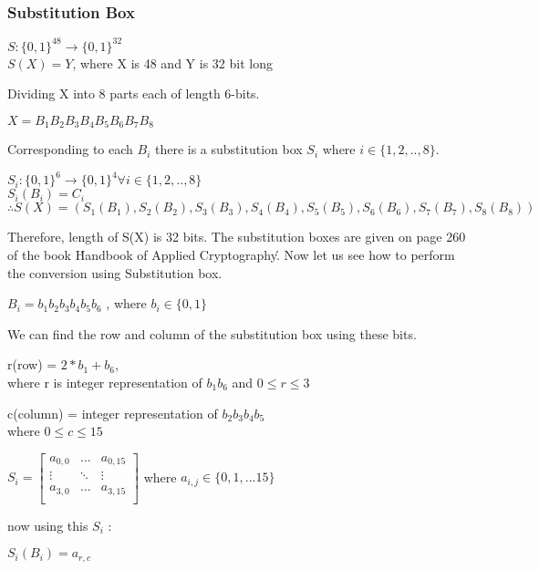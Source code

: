 \documentclass[11pt]{article}
\begin{document}
\subsubsection*{Substitution Box}
\begin{center}
    $S: \{0, 1\}^{48} \rightarrow \{0, 1\}^{32}$\\
    $S(X) = Y$,  where X is 48 and Y is 32 bit long
\end{center}
Dividing X into 8 parts each of length 6-bits.
\begin{center}
    $X = B_1B_2B_3B_4B_5B_6B_7B_8$\\
\end{center}
Corresponding to each $B_i$ there is a substitution box $S_i$ where $i \in \{1,2,..,8\}$.
\begin{center}
    $S_i: \{0, 1\}^6 \rightarrow \{0, 1\}^4  \forall i \in \{1,2,..,8\}$\\
    $S_i(B_i) = C_i$\\
    $\therefore S(X) = (S_1(B_1), S_2(B_2), S_3(B_3), S_4(B_4), S_5(B_5), S_6(B_6), S_7(B_7), S_8(B_8))$ 
\end{center}
Therefore, length of S(X) is 32 bits.
\vspace{3mm}
The substitution boxes are given on page 260 of the book \'Handbook of Applied Cryptography\'. Now let us see how to perform the conversion using Substitution box.\\
\begin{center}
    $B_i = b_1b_2b_3b_4b_5b_6$ , where $b_i \in \{0,1\} $
\end{center}
We can find the row and column of the substitution box using these bits.\\
\begin{center}
    r(row) = $2*b_1 + b_6$, \\
    where r is integer representation of $b_1b_6$  and $0 \leq r \leq 3 $\\
\end{center}
\begin{center}
    c(column) = integer representation of $b_2b_3b_4b_5$\\
    where $0 \leq c \leq  15 $
\end{center}
\begin{center}
    $ S_i = 
    \begin{bmatrix}
        a_{0,0} & \dots & a_{0,15}\\
        \vdots & \ddots & \vdots\\
        a_{3,0} & \dots & a_{3,15}\\
    \end{bmatrix}$ 
    where $a_{i,j} \in \{0, 1,...15\}$
\end{center}
now using this $S_i$ :
\begin{center}
    $S_i(B_i) = a_{r,c}$
\end{center}
\end{document}
